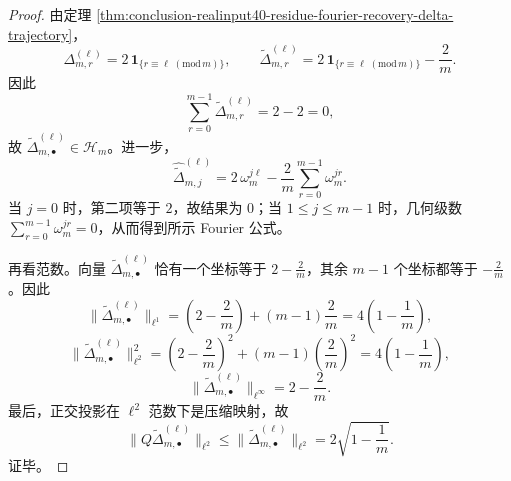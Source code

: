\begin{proof}
由定理 \ref{thm:conclusion-realinput40-residue-fourier-recovery-delta-trajectory}，
\[
\Delta_{m,r}^{(\ell)}
=
2\,\mathbf 1_{\{r\equiv \ell\;(\mathrm{mod}\,m)\}},
\qquad
\widetilde\Delta_{m,r}^{(\ell)}
=
2\,\mathbf 1_{\{r\equiv \ell\;(\mathrm{mod}\,m)\}}-\frac{2}{m}.
\]
因此
\[
\sum_{r=0}^{m-1}\widetilde\Delta_{m,r}^{(\ell)}=2-2=0,
\]
故 \(\widetilde\Delta_{m,\bullet}^{(\ell)}\in \mathcal H_m\)。进一步，
\[
\widehat{\widetilde\Delta}_{m,j}^{(\ell)}
=
2\,\omega_m^{j\ell}
-\frac{2}{m}\sum_{r=0}^{m-1}\omega_m^{jr}.
\]
当 \(j=0\) 时，第二项等于 \(2\)，故结果为 \(0\)；当 \(1\le j\le m-1\) 时，几何级数 \(\sum_{r=0}^{m-1}\omega_m^{jr}=0\)，从而得到所示 Fourier 公式。

再看范数。向量 \(\widetilde\Delta_{m,\bullet}^{(\ell)}\) 恰有一个坐标等于 \(2-\frac{2}{m}\)，其余 \(m-1\) 个坐标都等于 \(-\frac{2}{m}\)。因此
\[
\bigl\|\widetilde\Delta_{m,\bullet}^{(\ell)}\bigr\|_{\ell^1}
=
\left(2-\frac{2}{m}\right)+(m-1)\frac{2}{m}
=
4\left(1-\frac1m\right),
\]
\[
\bigl\|\widetilde\Delta_{m,\bullet}^{(\ell)}\bigr\|_{\ell^2}^2
=
\left(2-\frac{2}{m}\right)^2
+(m-1)\left(\frac{2}{m}\right)^2
=
4\left(1-\frac1m\right),
\]
\[
\bigl\|\widetilde\Delta_{m,\bullet}^{(\ell)}\bigr\|_{\ell^\infty}
=
2-\frac{2}{m}.
\]
最后，正交投影在 \(\ell^2\) 范数下是压缩映射，故
\[
\bigl\|Q\widetilde\Delta_{m,\bullet}^{(\ell)}\bigr\|_{\ell^2}
\le
\bigl\|\widetilde\Delta_{m,\bullet}^{(\ell)}\bigr\|_{\ell^2}
=
2\sqrt{1-\frac1m}.
\]
证毕。
\end{proof}

